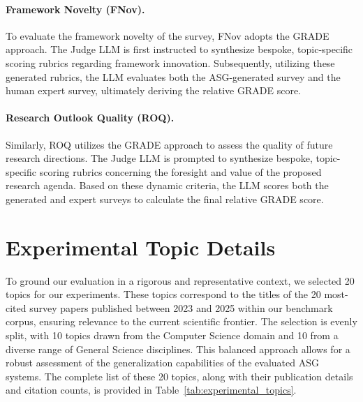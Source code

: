 \documentclass[11pt]{article}
\begin{document}
\paragraph{Framework Novelty (FNov).}
To evaluate the framework novelty of the survey, FNov adopts the GRADE approach. The Judge LLM is first instructed to synthesize bespoke, topic-specific scoring rubrics regarding framework innovation. Subsequently, utilizing these generated rubrics, the LLM evaluates both the ASG-generated survey and the human expert survey, ultimately deriving the relative GRADE score.

\paragraph{Research Outlook Quality (ROQ).}
Similarly, ROQ utilizes the GRADE approach to assess the quality of future research directions. The Judge LLM is prompted to synthesize bespoke, topic-specific scoring rubrics concerning the foresight and value of the proposed research agenda. Based on these dynamic criteria, the LLM scores both the generated and expert surveys to calculate the final relative GRADE score.

\section{Experimental Topic Details}
To ground our evaluation in a rigorous and representative context, we selected 20 topics for our experiments. These topics correspond to the titles of the 20 most-cited survey papers published between 2023 and 2025 within our benchmark corpus, ensuring relevance to the current scientific frontier. The selection is evenly split, with 10 topics drawn from the Computer Science domain and 10 from a diverse range of General Science disciplines. This balanced approach allows for a robust assessment of the generalization capabilities of the evaluated ASG systems. The complete list of these 20 topics, along with their publication details and citation counts, is provided in Table~\ref{tab:experimental_topics}.
\end{document}
